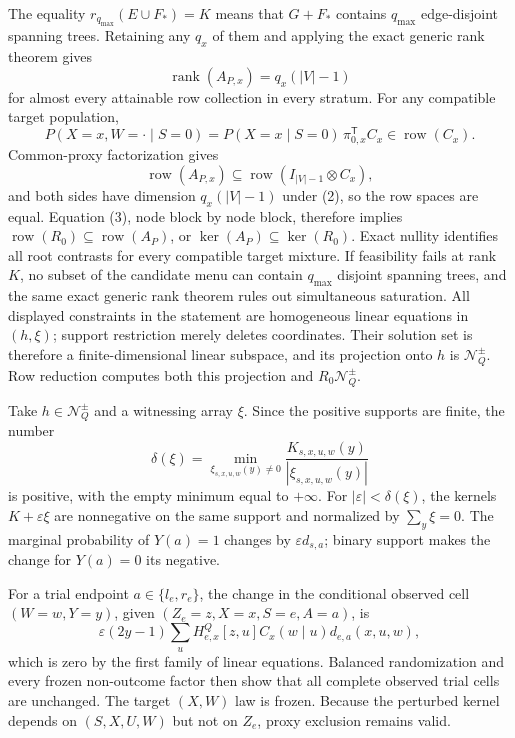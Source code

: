 The equality \(r_{q_{\max}}(E\cup F_*)=K\) means that \(G+F_*\) contains \(q_{\max}\) edge-disjoint spanning trees.  Retaining any \(q_x\) of them and applying the exact generic rank theorem gives
\[
\operatorname{rank}(A_{P,x})=q_x(|V|-1)
\tag{2}
\]
for almost every attainable row collection in every stratum.  For any compatible target population,
\[
P(X=x,W=\cdot\mid S=0)
=P(X=x\mid S=0)\,\pi_{0,x}^{\mathsf T}C_x
\in\operatorname{row}(C_x).
\tag{3}
\]
Common-proxy factorization gives
\[
\operatorname{row}(A_{P,x})
\subseteq\operatorname{row}(I_{|V|-1}\otimes C_x),
\]
and both sides have dimension \(q_x(|V|-1)\) under (2), so the row spaces are equal.  Equation (3), node block by node block, therefore implies \(\operatorname{row}(R_0)\subseteq\operatorname{row}(A_P)\), or \(\ker(A_P)\subseteq\ker(R_0)\).  Exact nullity identifies all root contrasts for every compatible target mixture.  If feasibility fails at rank \(K\), no subset of the candidate menu can contain \(q_{\max}\) disjoint spanning trees, and the same exact generic rank theorem rules out simultaneous saturation.
All displayed constraints in the statement are homogeneous linear equations in \((h,\xi)\); support restriction merely deletes coordinates.  Their solution set is therefore a finite-dimensional linear subspace, and its projection onto \(h\) is \(\mathcal N_Q^{\pm}\).  Row reduction computes both this projection and \(R_0\mathcal N_Q^{\pm}\).

Take \(h\in\mathcal N_Q^{\pm}\) and a witnessing array \(\xi\).  Since the positive supports are finite, the number
\[
\delta(\xi)=
\min_{\xi_{s,x,u,w}(y)\ne0}
\frac{K_{s,x,u,w}(y)}{|\xi_{s,x,u,w}(y)|}
\tag{1}
\]
is positive, with the empty minimum equal to \(+\infty\).  For \(|\varepsilon|<\delta(\xi)\), the kernels \(K+\varepsilon\xi\) are nonnegative on the same support and normalized by \(\sum_y\xi=0\).  The marginal probability of \(Y(a)=1\) changes by \(\varepsilon d_{s,a}\); binary support makes the change for \(Y(a)=0\) its negative.

For a trial endpoint \(a\in\{l_e,r_e\}\), the change in the conditional observed cell \((W=w,Y=y)\), given \((Z_e=z,X=x,S=e,A=a)\), is
\[
\varepsilon(2y-1)
\sum_uH^Q_{e,x}[z,u]C_x(w\mid u)d_{e,a}(x,u,w),
\tag{2}
\]
which is zero by the first family of linear equations.  Balanced randomization and every frozen non-outcome factor then show that all complete observed trial cells are unchanged.  The target \((X,W)\) law is frozen.  Because the perturbed kernel depends on \((S,X,U,W)\) but not on \(Z_e\), proxy exclusion remains valid.

